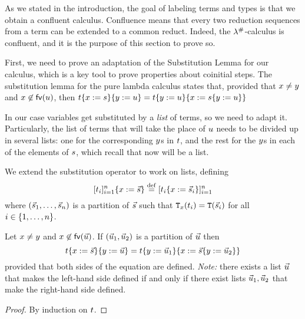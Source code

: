 As we stated in the introduction, the goal of labeling terms and types
is that we obtain a confluent calculus.
Confluence means that every two reduction sequences from a term
can be extended to a common reduct.
Indeed, the $\lambda^{\mathtt{\#}}$-calculus
is confluent, and it is the purpose of this section to prove so.


First, we need to prove an adaptation of the Substitution Lemma for our calculus,
which is a key tool to prove properties about coinitial steps.
The substitution lemma for the pure lambda calculus \cite[Lemma 2.1.16]{Barendregt:1984}  states that, provided that
$x \neq y$ and $x \not\in \mathsf{fv}({u})$, then
  $t\{x := s\}\{y := u\} =
    t\{y := u\}\{x := s\{y := u\}\}$

In our case variables get substituted by a \emph{list} of terms, so we need to adapt it.
Particularly, the list of terms that will take the place of $u$ needs to be
divided up in several lists: one for the corresponding $y$s in $t$, and the rest
for the $y$s in each of the elements of $s$, which recall that now will be a list.

\begin{notation}
We extend the substitution operator to work on lists,
defining
\[[t_i]_{i=1}^{n}\{x := \vec{s}\} \overset{\mathrm{def}}{=} [t_i\{x := \vec{s}_i\}]_{i=1}^{n}\]
where $(\vec{s}_1,\hdots,\vec{s}_n)$ is a partition of $\vec{s}$
such that $\mathtt{T}_{x}(t_i) = \mathtt{T}(\vec{s}_i)$ for all $i \in \{1,\hdots,n\}$.
\end{notation}

\begin{lemma}
Let $x \neq y$ and $x \not\in \mathsf{fv}({\vec{u}})$.
If $(\vec{u}_1,\vec{u}_2)$ is a partition of $\vec{u}$
then
\[
  t\{x := \vec{s}\}\{y := \vec{u}\}
  =
  t\{y := \vec{u}_1\}\{x := \vec{s}\{y := \vec{u}_2\}\}
\]
provided that both sides of the equation are defined.
{\em Note:} there exists a list $\vec{u}$ that makes the left-hand side defined
if and only if there exist lists $\vec{u}_1,\vec{u}_2$ that make the
right-hand side defined.
\end{lemma}
\begin{proof}
By induction on $t$.
\end{proof}

